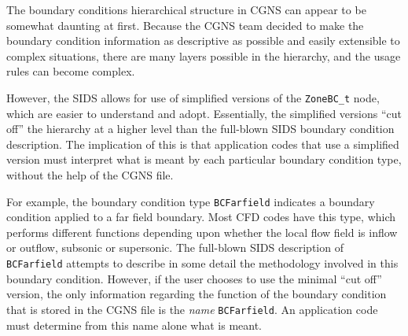 \documentclass[12pt]{article}
\begin{document}
The boundary conditions hierarchical structure in CGNS can appear
to be somewhat daunting at first.  Because the CGNS team decided
to make the boundary condition information as descriptive as possible
and easily extensible to complex situations, there are many
layers possible in the hierarchy, and the usage rules can
become complex.

However, the SIDS allows for use of simplified versions of the
{\tt ZoneBC\_t} node, which are easier to understand and adopt.
Essentially, the simplified versions ``cut off'' the hierarchy
at a higher level than the full-blown 
SIDS boundary condition description.  The
implication of this is that application codes that use
a simplified version must interpret what is meant by each 
particular boundary condition type, without the help of the CGNS file.

For example, the boundary condition 
type {\tt BCFarfield} indicates a boundary condition
applied to a far field boundary.  Most CFD codes have this type,
which performs different functions depending upon whether the
local flow field is inflow or outflow, subsonic or supersonic.
The full-blown SIDS description of {\tt BCFarfield} attempts to
describe in some detail the methodology involved in this boundary
condition.  However, if the user chooses to use the minimal ``cut off''
version, the only information regarding the function of the
boundary condition that is stored in the CGNS file is the
{\it name} {\tt BCFarfield}.  An application code must determine from this name
alone what is meant.

\end{document}
